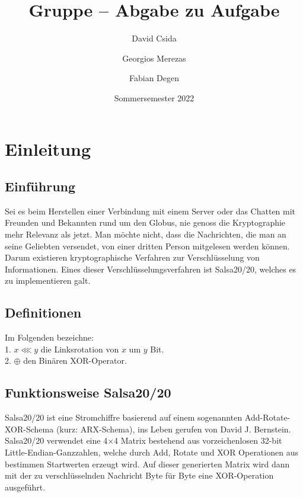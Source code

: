 \documentclass[course=erap]{aspdoc}
\author{David Csida \and Georgios Merezas \and Fabian Degen}
\date{Sommersemester 2022} %
\title{Gruppe \theGroup{} -- Abgabe zu Aufgabe \theNumber}
\begin{document}
\maketitle

\section{Einleitung}
\subsection{Einführung}
Sei es beim Herstellen einer Verbindung mit einem Server oder das Chatten mit Freunden und Bekannten rund um
den Globus, nie genoss die Kryptographie mehr Relevanz als jetzt. Man möchte nicht, dass die Nachrichten,
die man an seine Geliebten versendet, von einer dritten Person mitgelesen werden können. Darum existieren
kryptographische Verfahren zur Verschlüsselung von Informationen. Eines dieser Ver\-schlüsselungs\-verfahren ist
Salsa20/20, welches es zu implementieren galt.

\subsection{Definitionen}
Im Folgenden bezeichne: 
\\ \hspace*{5mm} 1. $x \lll y$ die Linksrotation von $x$ um $y$ Bit. 
\\ \hspace*{5mm} 2. $\oplus$ den Binären XOR-Operator.

\subsection{Funktionsweise Salsa20/20}
Salsa20/20 ist eine Stromchiffre basierend auf einem sogenannten Add-Rotate-XOR-Schema (kurz: ARX-Schema), ins Leben gerufen von
David J. Bernstein.
\\Salsa20/20 verwendet eine 4$\times$4 Matrix bestehend aus vorzeichenlosen 32-bit Little-Endian-Ganzzahlen,
welche durch Add, Rotate und XOR Operationen aus bestimmen Startwerten erzeugt wird.
Auf dieser generierten Matrix wird dann mit der zu ver\-schlü\-ssel\-nden Nachricht Byte für Byte eine XOR-Operation ausgeführt.
\end{document}
